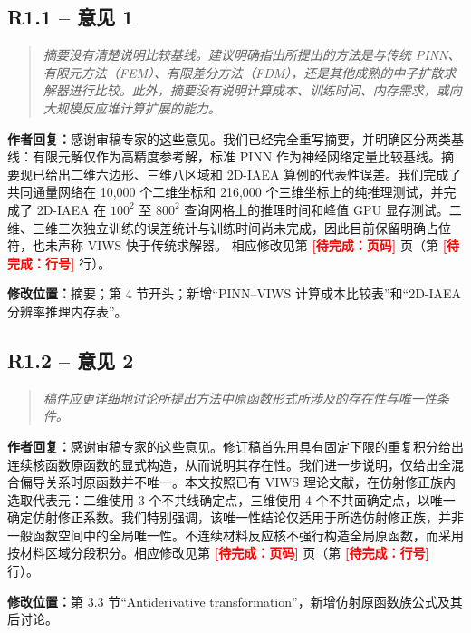 \documentclass[11pt,a4paper]{article}
\newenvironment{reviewercomment}{\begin{quote}\small\itshape\color{commentgray}}{\end{quote}}
\newcommand{\authorresponse}{\noindent\textbf{作者回复：}\quad}
\newcommand{\revisionlocation}[1]{\par\noindent\textcolor{locationblue}{\textbf{修改位置：}}#1}
\newcommand{\draftplaceholder}[1]{\textcolor{red}{\textbf{[待完成：#1]}}}
\begin{document}
\subsection*{R1.1 -- 意见 1}
\begin{reviewercomment}
摘要没有清楚说明比较基线。建议明确指出所提出的方法是与传统 PINN、有限元方法（FEM）、有限差分方法（FDM），还是其他成熟的中子扩散求解器进行比较。此外，摘要没有说明计算成本、训练时间、内存需求，或向大规模反应堆计算扩展的能力。
\end{reviewercomment}
\authorresponse 感谢审稿专家的这些意见。我们已经完全重写摘要，并明确区分两类基线：有限元解仅作为高精度参考解，标准 PINN 作为神经网络定量比较基线。摘要现已给出二维六边形、三维八区域和 2D-IAEA 算例的代表性误差。我们完成了共同通量网络在 10,000 个二维坐标和 216,000 个三维坐标上的纯推理测试，并完成了 2D-IAEA 在 $100^2$ 至 $800^2$ 查询网格上的推理时间和峰值 GPU 显存测试。二维、三维三次独立训练的误差统计与训练时间尚未完成，因此目前保留明确占位符，也未声称 VIWS 快于传统求解器。
相应修改见第 \draftplaceholder{页码} 页（第 \draftplaceholder{行号} 行）。
\revisionlocation{摘要；第 4 节开头；新增“PINN--VIWS 计算成本比较表”和“2D-IAEA 分辨率推理内存表”。}

\subsection*{R1.2 -- 意见 2}
\begin{reviewercomment}
稿件应更详细地讨论所提出方法中原函数形式所涉及的存在性与唯一性条件。
\end{reviewercomment}
\authorresponse 感谢审稿专家的这些意见。修订稿首先用具有固定下限的重复积分给出连续核函数原函数的显式构造，从而说明其存在性。我们进一步说明，仅给出全混合偏导关系时原函数并不唯一。本文按照已有 VIWS 理论文献，在仿射修正族内选取代表元：二维使用 3 个不共线确定点，三维使用 4 个不共面确定点，以唯一确定仿射修正系数。我们特别强调，该唯一性结论仅适用于所选仿射修正族，并非一般函数空间中的全局唯一性。不连续材料反应核不强行构造全局原函数，而采用按材料区域分段积分。相应修改见第 \draftplaceholder{页码} 页（第 \draftplaceholder{行号} 行）。
\revisionlocation{第 3.3 节“Antiderivative transformation”，新增仿射原函数族公式及其后讨论。}
\end{document}
